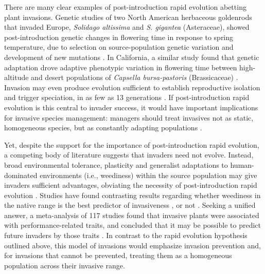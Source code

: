 \documentclass[12pt]{article}\usepackage[]{graphicx}\usepackage[]{color}
\begin{document}
	There are many clear examples of post-introduction rapid evolution abetting plant invasions. Genetic studies of two North American herbaceous goldenrods that invaded Europe, \textit{Solidago altissima} and \textit{S. gigantea} (Asteraceae), showed post-introduction genetic changes in flowering time in response to spring temperature, due to selection on source-population genetic variation and development of new mutations \parencite{Weber1998}. %
In California, a similar study found that genetic adaptation drove adaptive phenotypic variation in flowering time between high-altitude and desert populations of \textit{Capsella bursa-pastoris} (Brassicaceae) \parencite{Linde2001}. Invasion may even produce evolution sufficient to establish reproductive isolation and trigger speciation, in as few as 13 generations \parencite{Hendry2000}. If post-introduction rapid evolution is this central to invader success, it would have important implications for invasive species management: managers should treat invasives not as static, homogeneous species, but as constantly adapting populations \parencite{Lee2002invasion}.
	
	Yet, despite the support for the importance of post-introduction rapid evolution, a competing body of literature suggests that invaders need not evolve. Instead, broad environmental tolerance, plasticity and generalist adaptations to human-dominated environments (i.e., weediness) within the source population may give invaders sufficient advantages, obviating the necessity of post-introduction rapid evolution \parencite{Richards2006,Schwartz1994,Bock2015,Rejmanek1996,Baker1965}. %
	Studies have found contrasting results regarding whether weediness in the native range is the best predictor of invasiveness %
	\parencite[e.g.,][]{Maillet2000}, or not \parencite{Perrins1992,Mack1996}. Seeking a unified answer, a meta-analysis of 117 studies found that invasive plants were associated with performance-related traits, and concluded that it may be possible to predict future invaders by those traits \parencite{VanKleunen2010}. In contrast to the rapid evolution hypothesis outlined above, this model of invasions would emphasize invasion prevention and, for invasions that cannot be prevented, treating them as a homogeneous population across their invasive range.
\end{document}
